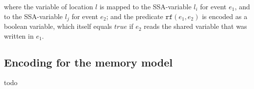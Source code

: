 where the variable of location $l$ is mapped to the SSA-variable $l_i$ for event $e_1$, and to the SSA-variable $l_j$ for event $e_2$; and the predicate $\mathtt{rf}(e_1, e_2)$ is encoded as a boolean variable, which itself equals $true$ if $e_2$ reads the shared variable that was written in $e_1$.


\subsection{Encoding for the memory model} %
\label{ch:port:enc:wmm}

todo


%
